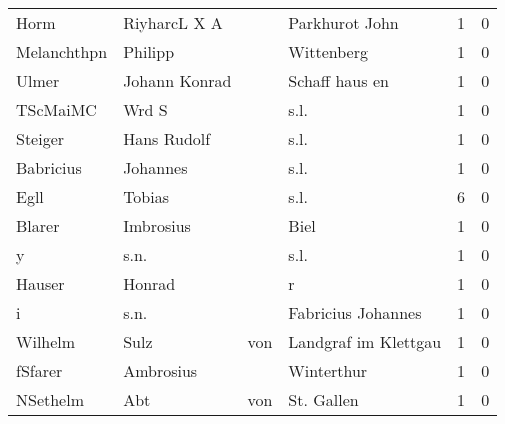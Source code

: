 \begin{center}
\begin{tiny}
\begin{longtabu}{llllrr}
                     Horm &                       RiyharcL X A &             &                              Parkhurot John &          1 &         0 \\
              Melanchthpn &                            Philipp &             &                                  Wittenberg &          1 &         0 \\
                    Ulmer &                      Johann Konrad &             &                              Schaff haus en &          1 &         0 \\
                 TScMaiMC &                              Wrd S &             &                                        s.l. &          1 &         0 \\
                  Steiger &                        Hans Rudolf &             &                                        s.l. &          1 &         0 \\
                Babricius &                           Johannes &             &                                        s.l. &          1 &         0 \\
                     Egll &                             Tobias &             &                                        s.l. &          6 &         0 \\
                   Blarer &                          Imbrosius &             &                                        Biel &          1 &         0 \\
                        y &                               s.n. &             &                                        s.l. &          1 &         0 \\
                   Hauser &                             Honrad &             &                                           r &          1 &         0 \\
                        i &                               s.n. &             &                          Fabricius Johannes &          1 &         0 \\
                  Wilhelm &                               Sulz &         von &                        Landgraf im Klettgau &          1 &         0 \\
                  fSfarer &                          Ambrosius &             &                                  Winterthur &          1 &         0 \\
                 NSethelm &                                Abt &         von &                                  St. Gallen &          1 &         0 \\

\end{longtabu}
\end{tiny}
\end{center}
